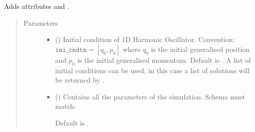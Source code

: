 \documentclass[a4paper,landscape,10pt,english]{sphinxmanual}
\begin{document}
\begin{fulllineitems}
\begin{fulllineitems}
Adds attributes
{\hyperref[\detokenize{code_docs/simulation_API.simulation:simulation_API.simulation.simulations.HarmonicOsc1D.m}]{}} and
{\hyperref[\detokenize{code_docs/simulation_API.simulation:simulation_API.simulation.simulations.HarmonicOsc1D.k}]{}}.
\begin{quote}\begin{description}
\item[{Parameters}] \leavevmode\begin{itemize}
\item {} 
 (\sphinxstyleliteralemphasis{\sphinxupquote{, }}\sphinxstyleliteralemphasis{\sphinxupquote{ (}}\sphinxstyleliteralemphasis{\sphinxupquote{,}}\sphinxstyleliteralemphasis{\sphinxupquote{)}}) \textendash{} Initial condition of 1D Harmonic Oscillator. Convention:
\(\texttt{ini_cndtn} = [q_0, p_0]\) where \(q_0\) is the initial
generalised position and \(p_0\) is the initial generalised
momentum. Default is \sphinxcode{\sphinxupquote{{[}0., 1.{]}}}. A list of initial conditions
can be used, in this case a list of solutions will be returned by
{\hyperref[\detokenize{code_docs/simulation_API.simulation:simulation_API.simulation.simulations.Simulation.simulate}]{}}.

\item {} 
 (\sphinxstyleliteralemphasis{\sphinxupquote{, }}) \textendash{} 
Contains all the parameters of the simulation. Schema must match:

\begin{sphinxVerbatim}[commandchars=\\\{\}]
          
          
\end{sphinxVerbatim}

Default is  .



\end{itemize}
\end{description}
\end{quote}
\end{fulllineitems}
\end{fulllineitems}
\end{document}
